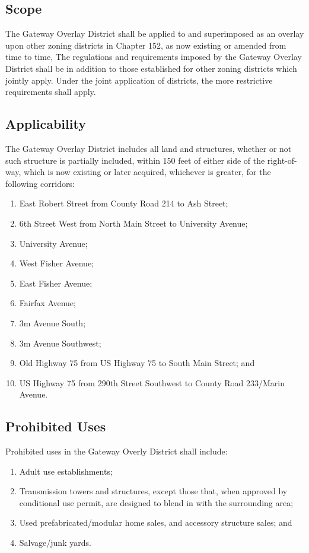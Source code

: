 \subsection{Scope}
The Gateway Overlay District shall be applied to and superimposed as an overlay upon other zoning districts in Chapter 152, as now existing or amended from time to time, The regulations and requirements imposed by the Gateway Overlay District shall be in addition to those established for other zoning districts which jointly apply. Under the joint application of districts, the more restrictive requirements shall apply.
\subsection{Applicability}
The Gateway Overlay District includes all land and structures, whether or not such structure is partially included, within 150 feet of either side of the right-of-way, which is now existing or later acquired, whichever is greater, for the following corridors:
\begin{enumerate}[{\indent}1)]
    \item East Robert Street from County Road 214 to Ash Street;
    \item 6th Street West from North Main Street to University Avenue;
    \item University Avenue;
    \item West Fisher Avenue;
    \item East Fisher Avenue;
    \item Fairfax Avenue;
    \item 3m Avenue South;
    \item 3m Avenue Southwest;
    \item Old Highway 75 from US Highway 75 to South Main Street; and
    \item US Highway 75 from 290th Street Southwest to County Road 233/Marin Avenue.
\end{enumerate}
\subsection{Prohibited Uses}
Prohibited uses in the Gateway Overly District shall include:
\begin{enumerate}[{\indent}1)]
    \item Adult use establishments;
    \item Transmission towers and structures, except those that, when approved by conditional use permit, are designed to blend in with the surrounding area;
    \item Used prefabricated/modular home sales, and accessory structure sales; and
    \item Salvage/junk yards.
\end{enumerate}
